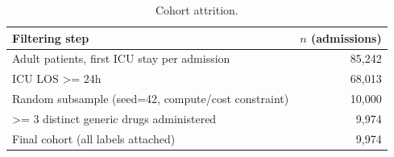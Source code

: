 \begin{table}[t]
\centering
\caption{Cohort attrition.}
\label{tab:attrition}
\begin{tabular}{lr}
\toprule
Filtering step & $n$ (admissions) \\
\midrule
Adult patients, first ICU stay per admission & 85,242 \\
ICU LOS >= 24h & 68,013 \\
Random subsample (seed=42, compute/cost constraint) & 10,000 \\
>= 3 distinct generic drugs administered & 9,974 \\
Final cohort (all labels attached) & 9,974 \\
\bottomrule
\end{tabular}
\end{table}
